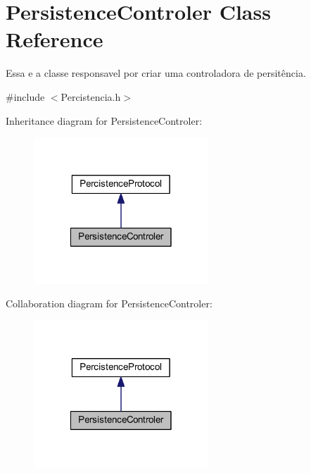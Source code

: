 \hypertarget{class_persistence_controler}{\section{Persistence\-Controler Class Reference}
\label{class_persistence_controler}
}


Essa e a classe responsavel por criar uma controladora de persitência.  




{\ttfamily \#include $<$Percistencia.\-h$>$}



Inheritance diagram for Persistence\-Controler\-:\nopagebreak
\begin{figure}[H]
\begin{center}
\leavevmode
\includegraphics[width=186pt]{class_persistence_controler__inherit__graph}
\end{center}
\end{figure}


Collaboration diagram for Persistence\-Controler\-:\nopagebreak
\begin{figure}[H]
\begin{center}
\leavevmode
\includegraphics[width=186pt]{class_persistence_controler__coll__graph}
\end{center}
\end{figure}
